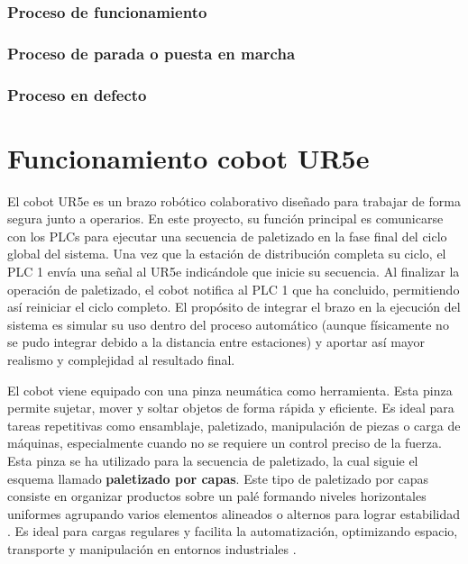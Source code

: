 \subsubsection{Proceso de funcionamiento}


\subsubsection{Proceso de parada o puesta en marcha}


\subsubsection{Proceso en defecto}

\clearpage

\section{Funcionamiento cobot UR5e}
\label{sec:funcionamiento_ur5e}

El cobot UR5e es un brazo robótico colaborativo diseñado para trabajar de forma segura junto a operarios. En este proyecto, su función principal es comunicarse con los PLCs para ejecutar una secuencia de paletizado en la fase final del ciclo global del sistema. Una vez que la estación de distribución completa su ciclo, el PLC 1 envía una señal al UR5e indicándole que inicie su secuencia. Al finalizar la operación de paletizado, el cobot notifica al PLC 1 que ha concluido, permitiendo así reiniciar el ciclo completo. El propósito de integrar el brazo en la ejecución del sistema es simular su uso dentro del proceso automático (aunque físicamente no se pudo integrar debido a la distancia entre estaciones) y aportar así mayor realismo y complejidad al resultado final. 

El cobot viene equipado con una pinza neumática como herramienta. Esta pinza permite sujetar, mover y soltar objetos de forma rápida y eficiente. Es ideal para tareas repetitivas como ensamblaje, paletizado, manipulación de piezas o carga de máquinas, especialmente cuando no se requiere un control preciso de la fuerza. Esta pinza se ha utilizado para la secuencia de paletizado, la cual siguie el esquema llamado \textbf{paletizado por capas}. Este tipo de paletizado por capas consiste en organizar productos sobre un palé formando niveles horizontales uniformes agrupando varios elementos alineados o alternos para lograr estabilidad \cite{paletizado_capas}. Es ideal para cargas regulares y facilita la automatización, optimizando espacio, transporte y manipulación en entornos industriales \cite{paletizado_capas}. 

